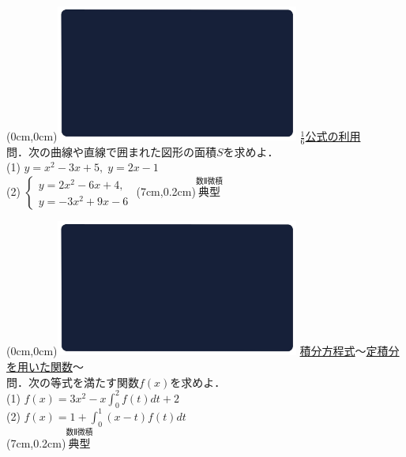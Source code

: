 \documentclass[10pt,
fleqn,
dvipdfmx,
uplatex
]{jsarticle}
\begin{document}
\newpage

\at(0cm,0cm){\includegraphics[width=8cm,bb=0 0 1920 1080]{./youtube/thumbnails/templates/smart_background/数II微積.jpeg}}
{\color{orange}\Large\underline{$\frac{1}{6}$公式の利用}}\vspace{0.3zw}\\
\large 
問．次の曲線や直線で囲まれた図形の面積$S$を求めよ．\\
(1)  $y=x^2-3x+5,\;y=2x-1$\\
(2)  $\left\{\begin{array}{l}y=2x^2-6x+4,\;\\y=-3x^2+9x-6\end{array}\right.$
\at(7cm,0.2cm){\small\color{bradorange}$\overset{\text{数Ⅱ微積}}{\text{典型}}$}

\newpage

\at(0cm,0cm){\includegraphics[width=8cm,bb=0 0 1920 1080]{./youtube/thumbnails/templates/smart_background/数II微積.jpeg}}
{\color{orange}\large\underline{積分方程式$〜$定積分を用いた関数$〜$}}\vspace{0.3zw}\\
\large 
問．次の等式を満たす関数$f\left(x\right)$を求めよ．\\
(1)  $f\left(x\right)=3x^2-x\displaystyle\int_0^2f\left(t\right)dt+2$\\
(2)  $f\left(x\right)=1+\displaystyle\int_0^1\left(x-t\right)f\left(t\right)dt$\\
\at(7cm,0.2cm){\small\color{bradorange}$\overset{\text{数Ⅱ微積}}{\text{典型}}$}

\newpage
\end{document}

